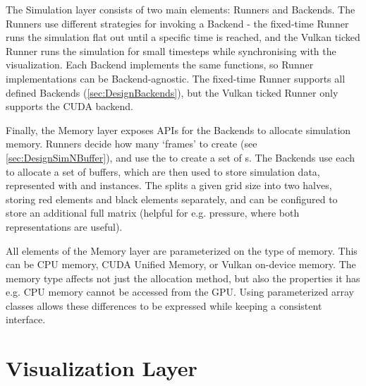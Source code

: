The Simulation layer consists of two main elements: Runners and Backends.
The Runners use different strategies for invoking a Backend - the fixed-time Runner runs the simulation flat out until a specific time is reached, and the Vulkan ticked Runner runs the simulation for small timesteps while synchronising with the visualization.
Each Backend implements the same functions, so Runner implementations can be Backend-agnostic.
The fixed-time Runner supports all defined Backends (\cref{sec:DesignBackends}), but the Vulkan ticked Runner only supports the CUDA backend.

Finally, the Memory layer exposes APIs for the Backends to allocate simulation memory.
Runners decide how many `frames' to create (see \cref{sec:DesignSimNBuffer}), and use the  to create a set of s.
The Backends use each  to allocate a set of buffers, which are then used to store simulation data, represented with  and  instances.
The  splits a given grid size into two halves, storing red elements and black elements separately, and can be configured to store an additional full matrix (helpful for e.g. pressure, where both representations are useful).


All elements of the Memory layer are parameterized on the type of memory.
This can be CPU memory, CUDA Unified Memory, or Vulkan on-device memory. 
The memory type affects not just the allocation method, but also the properties it has e.g. CPU memory cannot be accessed from the GPU.
Using parameterized array classes allows these differences to be expressed while keeping a consistent interface.



\pagebreak
\section{Visualization Layer}



